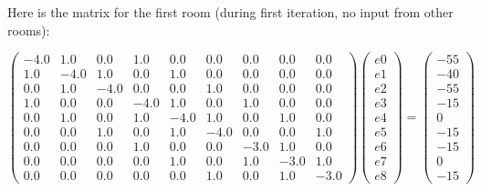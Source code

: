 \documentclass{article}
\begin{document}
    Here is the matrix for the first room (during first iteration, no input from other rooms):

    \[
    \begin{pmatrix}
-4.0 & 1.0 & 0.0 & 1.0 & 0.0 & 0.0 & 0.0 & 0.0 & 0.0 \\
1.0 & -4.0 & 1.0 & 0.0 & 1.0 & 0.0 & 0.0 & 0.0 & 0.0 \\
0.0 & 1.0 & -4.0 & 0.0 & 0.0 & 1.0 & 0.0 & 0.0 & 0.0 \\
1.0 & 0.0 & 0.0 & -4.0 & 1.0 & 0.0 & 1.0 & 0.0 & 0.0 \\
0.0 & 1.0 & 0.0 & 1.0 & -4.0 & 1.0 & 0.0 & 1.0 & 0.0 \\
0.0 & 0.0 & 1.0 & 0.0 & 1.0 & -4.0 & 0.0 & 0.0 & 1.0 \\
0.0 & 0.0 & 0.0 & 1.0 & 0.0 & 0.0 & -3.0 & 1.0 & 0.0 \\
0.0 & 0.0 & 0.0 & 0.0 & 1.0 & 0.0 & 1.0 & -3.0 & 1.0 \\
0.0 & 0.0 & 0.0 & 0.0 & 0.0 & 1.0 & 0.0 & 1.0 & -3.0
\end{pmatrix}\begin{pmatrix}
e0 \\
 e1 \\
 e2 \\
 e3 \\
 e4 \\
 e5 \\
 e6 \\
 e7 \\
 e8\end{pmatrix}=\begin{pmatrix}
-55 \\
 -40 \\
 -55 \\
 -15 \\
 0 \\
 -15 \\
 -15 \\
 0 \\
 -15\end{pmatrix}
    \]

    
\end{document}
